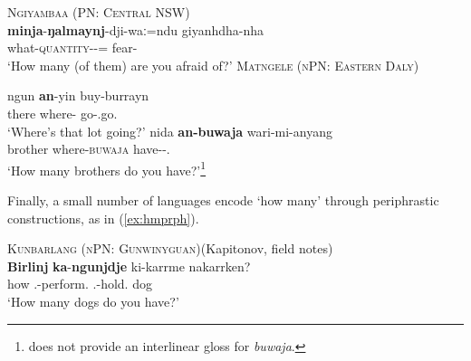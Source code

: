 \documentclass[12pt,egregdoesnotlikesansseriftitles]{scrartcl}
\begin{document}
 \begin{exe}
   \ex\label{ex:hmwhatq}\textsc{Ngiyambaa (PN: Central NSW)}\hfill {}\\
   \gll \textbf{minja}-\textbf{ŋalmaynj}-dji-waː=ndu giyanhdha-nha\\
   what-\textsc{quantity}-\Circ-\Excl=\Second\Nom{} fear-\Prs\\
   \glt `How many (of them) are you afraid of?'
   \ex \label{howmanyex2} \textsc{Matngele (nPN: Eastern Daly)}\hfill {}
   \begin{xlist}
     \ex \gll ngun \textbf{an}-yin buy-burrayn\\
     there where-\All{} go-\Third\Aug\Sbj.go.\Impv\\
     \glt `Where's that lot going?' %
     \ex \gll nida \textbf{an-buwaja} wari-mi-anyang\\
     brother where-\textsc{buwaja} have-\Impv-\Second\Min\Sbj.\Prs\\
     \glt `How many brothers do you have?'\footnote{\cite{zandvoort99} does not provide an interlinear gloss for \textit{buwaja}.} %
   \end{xlist}
 \end{exe}
  
 Finally, a small number of languages encode `how many'  through periphrastic constructions, as in (\ref{ex:hmprph}).
  
  \begin{exe}
  \ex\label{ex:hmprph}\textsc{Kunbarlang (nPN: Gunwinyguan)}\hfill (Kapitonov, field notes)\\
  \gll \textbf{Birlinj} \textbf{ka}-\textbf{ngunjdje} ki-karrme nakarrken?\\
  how \Tsg.\Nfut-perform.\Np{} \Ssg.\Nfut-hold.\Np{} dog\\
  \glt `How many dogs do you have?' %
\end{exe}
\end{document}
